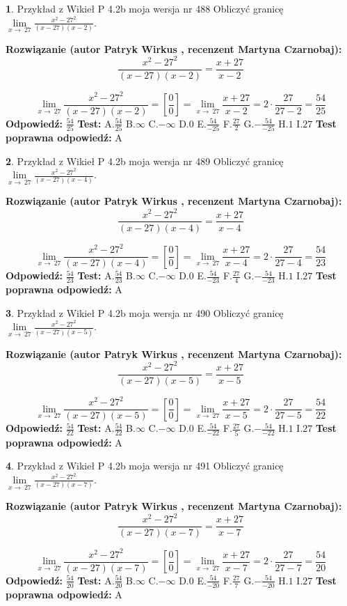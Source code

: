 \documentclass[12pt, a4paper]{article}
\theoremstyle{definition} %
\newtheorem{zad}{}
\newcommand{\zadStart}[1]{\begin{zad}#1\newline}
\newcommand{\zadStop}{\end{zad}}
\newcommand{\rozwStart}[2]{\noindent \textbf{Rozwiązanie (autor #1 , recenzent #2): }\newline}
\newcommand{\rozwStop}{\newline}
\newcommand{\odpStart}{\noindent \textbf{Odpowiedź:}\newline}
\newcommand{\odpStop}{\newline}
\newcommand{\testStart}{\noindent \textbf{Test:}\newline}
\newcommand{\testStop}{\newline}
\newcommand{\kluczStart}{\noindent \textbf{Test poprawna odpowiedź:}\newline}
\newcommand{\kluczStop}{\newline}
\begin{document}
\zadStart{Przykład z Wikieł P 4.2b moja wersja nr 488}
Obliczyć granicę $\lim\limits_{x\to\ 27}\frac{x^{2}-27^{2}}{(x-27)(x-2)}$.
\zadStop
\rozwStart{Patryk Wirkus}{Martyna Czarnobaj}
$$\frac{x^{2}-27^{2}}{(x-27)(x-2)}=\frac{x+27}{x-2}$$

$$\lim\limits_{x\to\ 27}\frac{x^{2}-27^{2}}{(x-27)(x-2)}=[\frac{0}{0}]=\lim\limits_{x\to\ 27}\frac{x+27}{x-2}=2 \cdot \frac{27}{27-2} = \frac{54}{25}$$
\rozwStop
\odpStart
$\frac{54}{25}$
\odpStop
\testStart
A.$\frac{54}{25}$
B.$\infty$
C.$-\infty$
D.$0$
E.$\frac{54}{-25}$
F.$\frac{27}{2}$
G.$-\frac{54}{-25}$
H.$1$
I.$27$
\testStop
\kluczStart
A
\kluczStop



\zadStart{Przykład z Wikieł P 4.2b moja wersja nr 489}
Obliczyć granicę $\lim\limits_{x\to\ 27}\frac{x^{2}-27^{2}}{(x-27)(x-4)}$.
\zadStop
\rozwStart{Patryk Wirkus}{Martyna Czarnobaj}
$$\frac{x^{2}-27^{2}}{(x-27)(x-4)}=\frac{x+27}{x-4}$$

$$\lim\limits_{x\to\ 27}\frac{x^{2}-27^{2}}{(x-27)(x-4)}=[\frac{0}{0}]=\lim\limits_{x\to\ 27}\frac{x+27}{x-4}=2 \cdot \frac{27}{27-4} = \frac{54}{23}$$
\rozwStop
\odpStart
$\frac{54}{23}$
\odpStop
\testStart
A.$\frac{54}{23}$
B.$\infty$
C.$-\infty$
D.$0$
E.$\frac{54}{-23}$
F.$\frac{27}{4}$
G.$-\frac{54}{-23}$
H.$1$
I.$27$
\testStop
\kluczStart
A
\kluczStop



\zadStart{Przykład z Wikieł P 4.2b moja wersja nr 490}
Obliczyć granicę $\lim\limits_{x\to\ 27}\frac{x^{2}-27^{2}}{(x-27)(x-5)}$.
\zadStop
\rozwStart{Patryk Wirkus}{Martyna Czarnobaj}
$$\frac{x^{2}-27^{2}}{(x-27)(x-5)}=\frac{x+27}{x-5}$$

$$\lim\limits_{x\to\ 27}\frac{x^{2}-27^{2}}{(x-27)(x-5)}=[\frac{0}{0}]=\lim\limits_{x\to\ 27}\frac{x+27}{x-5}=2 \cdot \frac{27}{27-5} = \frac{54}{22}$$
\rozwStop
\odpStart
$\frac{54}{22}$
\odpStop
\testStart
A.$\frac{54}{22}$
B.$\infty$
C.$-\infty$
D.$0$
E.$\frac{54}{-22}$
F.$\frac{27}{5}$
G.$-\frac{54}{-22}$
H.$1$
I.$27$
\testStop
\kluczStart
A
\kluczStop



\zadStart{Przykład z Wikieł P 4.2b moja wersja nr 491}
Obliczyć granicę $\lim\limits_{x\to\ 27}\frac{x^{2}-27^{2}}{(x-27)(x-7)}$.
\zadStop
\rozwStart{Patryk Wirkus}{Martyna Czarnobaj}
$$\frac{x^{2}-27^{2}}{(x-27)(x-7)}=\frac{x+27}{x-7}$$

$$\lim\limits_{x\to\ 27}\frac{x^{2}-27^{2}}{(x-27)(x-7)}=[\frac{0}{0}]=\lim\limits_{x\to\ 27}\frac{x+27}{x-7}=2 \cdot \frac{27}{27-7} = \frac{54}{20}$$
\rozwStop
\odpStart
$\frac{54}{20}$
\odpStop
\testStart
A.$\frac{54}{20}$
B.$\infty$
C.$-\infty$
D.$0$
E.$\frac{54}{-20}$
F.$\frac{27}{7}$
G.$-\frac{54}{-20}$
H.$1$
I.$27$
\testStop
\kluczStart
A
\kluczStop
\end{document}
